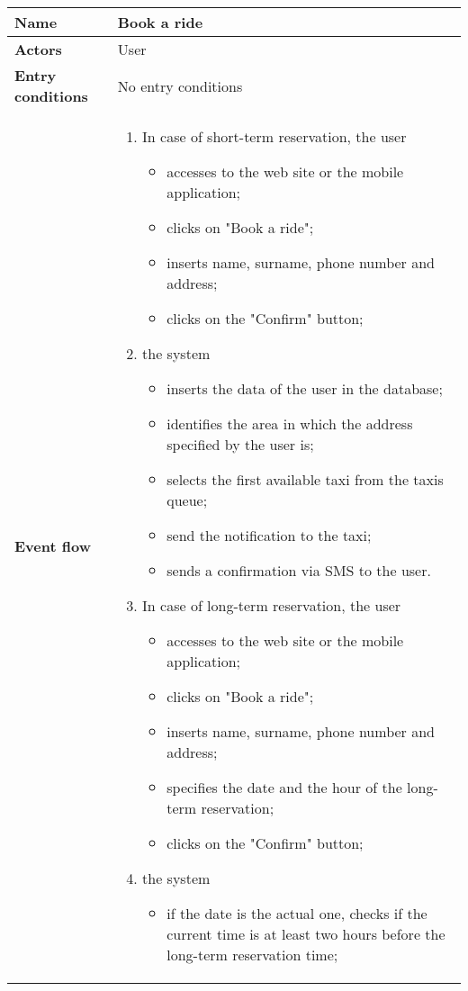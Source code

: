 \vspace{20pt}
\noindent
\begin{tabular}{l l}
 \textbf {Name} & Book a ride  \\ \hline
 \textbf{Actors} & User \\ \hline
 \textbf{Entry conditions} & No entry conditions \\ \hline
 \textbf{Event flow} & 
 \parbox{0.9\textwidth}{
 \begin{enumerate}
 \item In case of short-term reservation, the user
 \begin{itemize}
 \item accesses to the web site or the mobile application;
 \item clicks on "Book a ride";
 \item inserts name, surname, phone number and address;
 \item clicks on the "Confirm" button;
 \end{itemize}
 \item the system
 \begin{itemize}
 \item inserts the data of the user in the database;
 \item identifies the area in which the address specified by the user is;
 \item selects the first available taxi from the taxis queue;
 \item send the notification to the taxi;
 \item sends a confirmation via SMS to the user.
 \end{itemize}
 \item In case of long-term reservation, the user
 \begin{itemize}
 \item accesses to the web site or the mobile application;
 \item clicks on "Book a ride";
 \item inserts name, surname, phone number and address;
 \item specifies the date and the hour of the long-term reservation;
 \item clicks on the "Confirm" button;
 \end{itemize}
 \item the system
 \begin{itemize}
 \item if the date is the actual one, checks if the current time is at least two hours before the long-term reservation time;

\end{itemize}
\end{enumerate}}
\end{tabular}
